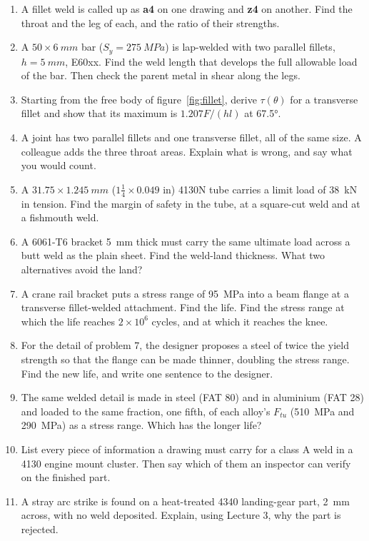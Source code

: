 \documentclass[11pt,a4paper]{article}
\begin{document}
\begin{enumerate}[nosep,leftmargin=1.5em]
  \item A fillet weld is called up as \textbf{a4} on one drawing and \textbf{z4} on another.
        Find the throat and the leg of each, and the ratio of their strengths.
  \item A $50\times\SI{6}{mm}$ bar ($S_y=\SI{275}{MPa}$) is lap-welded with two parallel fillets,
        $h=\SI{5}{mm}$, E60xx. Find the weld length that develops the full allowable load of the
        bar. Then check the parent metal in shear along the legs.
  \item Starting from the free body of figure~\ref{fig:fillet}, derive $\tau(\theta)$ for a
        transverse fillet and show that its maximum is $1.207F/(hl)$ at \ang{67.5}.
  \item A joint has two parallel fillets and one transverse fillet, all of the same size. A
        colleague adds the three throat areas. Explain what is wrong, and say what you would
        count.
  \item A $31.75\times\SI{1.245}{mm}$ ($1\tfrac14\times0.049$ in) 4130N tube carries a limit load
        of \SI{38}{kN} in tension. Find the margin of safety in the tube, at a square-cut weld and
        at a fishmouth weld.
  \item A 6061-T6 bracket \SI{5}{mm} thick must carry the same ultimate load across a butt weld as
        the plain sheet. Find the weld-land thickness. What two alternatives avoid the land?
  \item A crane rail bracket puts a stress range of \SI{95}{MPa} into a beam flange at a
        transverse fillet-welded attachment. Find the life. Find the stress range at which the
        life reaches $2\times10^{6}$ cycles, and at which it reaches the knee.
  \item For the detail of problem 7, the designer proposes a steel of twice the yield strength so
        that the flange can be made thinner, doubling the stress range. Find the new life, and
        write one sentence to the designer.
  \item The same welded detail is made in steel (FAT 80) and in aluminium (FAT 28) and loaded to
        the same fraction, one fifth, of each alloy's $F_{tu}$ (\SI{510}{MPa} and \SI{290}{MPa}) as
        a stress range. Which has the longer life?
  \item List every piece of information a drawing must carry for a class A weld in a 4130 engine
        mount cluster. Then say which of them an inspector can verify on the finished part.
  \item A stray arc strike is found on a heat-treated 4340 landing-gear part, \SI{2}{mm} across,
        with no weld deposited. Explain, using Lecture 3, why the part is rejected.
\end{enumerate}
\end{document}
